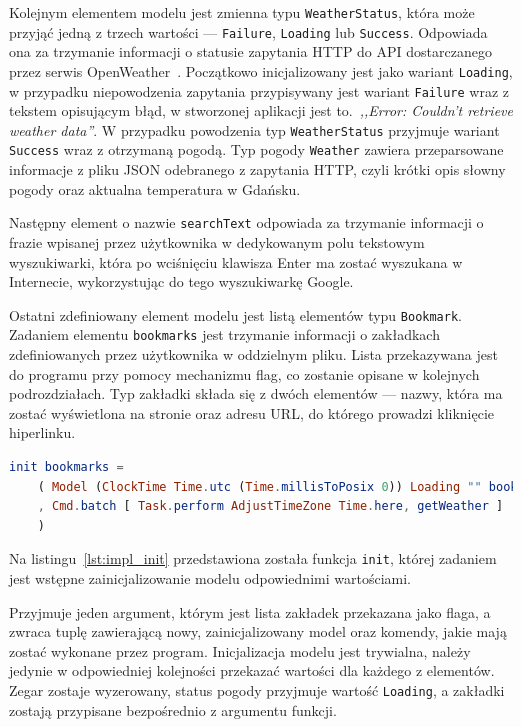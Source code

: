 \documentclass[twoside,a4paper]{report}
\begin{document}
Kolejnym elementem modelu jest zmienna typu \texttt{WeatherStatus}, która może przyjąć jedną z trzech wartości --- \texttt{Failure}, \texttt{Loading} lub \texttt{Success}.
Odpowiada ona za trzymanie informacji o statusie zapytania HTTP do API dostarczanego przez serwis OpenWeather~\cite{openweather}.
Początkowo inicjalizowany jest jako wariant \texttt{Loading}, w przypadku niepowodzenia zapytania przypisywany jest wariant \texttt{Failure} wraz z tekstem opisującym błąd, w stworzonej aplikacji jest to.~\textit{,,Error: Couldn't retrieve weather data''}.
W przypadku powodzenia typ \texttt{WeatherStatus} przyjmuje wariant \texttt{Success} wraz z otrzymaną pogodą.
Typ pogody \texttt{Weather} zawiera przeparsowane informacje z pliku JSON odebranego z zapytania HTTP, czyli krótki opis słowny pogody oraz aktualna temperatura w Gdańsku.

Następny element o nazwie \texttt{searchText} odpowiada za trzymanie informacji o frazie wpisanej przez użytkownika w dedykowanym polu tekstowym wyszukiwarki, która po wciśnięciu klawisza Enter ma zostać wyszukana w Internecie, wykorzystując do tego wyszukiwarkę Google.

Ostatni zdefiniowany element modelu jest listą elementów typu \texttt{Bookmark}.
Zadaniem elementu \texttt{bookmarks} jest trzymanie informacji o zakładkach zdefiniowanych przez użytkownika w oddzielnym pliku.
Lista przekazywana jest do programu przy pomocy mechanizmu flag, co zostanie opisane w kolejnych podrozdziałach.
Typ zakładki składa się z dwóch elementów --- nazwy, która ma zostać wyświetlona na stronie oraz adresu URL, do którego prowadzi kliknięcie hiperlinku.

\begin{lstlisting}[caption={Funkcja inicjalizująca model},label={lst:impl_init},language={Elm}]
init bookmarks =
    ( Model (ClockTime Time.utc (Time.millisToPosix 0)) Loading "" bookmarks
    , Cmd.batch [ Task.perform AdjustTimeZone Time.here, getWeather ]
    )
\end{lstlisting}

Na listingu~\ref{lst:impl_init} przedstawiona została funkcja \texttt{init}, której zadaniem jest wstępne zainicjalizowanie modelu odpowiednimi wartościami.

Przyjmuje jeden argument, którym jest lista zakładek przekazana jako flaga, a zwraca tuplę zawierającą nowy, zainicjalizowany model oraz komendy, jakie mają zostać wykonane przez program.
Inicjalizacja modelu jest trywialna, należy jedynie w odpowiedniej kolejności przekazać wartości dla każdego z elementów.
Zegar zostaje wyzerowany, status pogody przyjmuje wartość \texttt{Loading}, a zakładki zostają przypisane bezpośrednio z argumentu funkcji.
\end{document}
